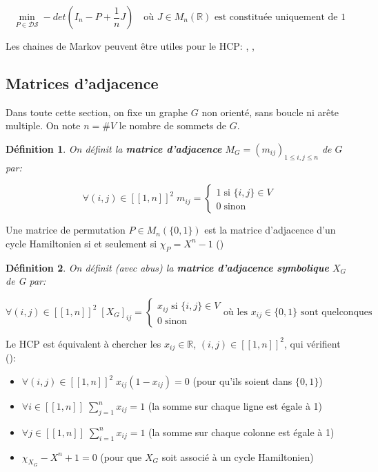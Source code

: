\documentclass{article}
\newtheorem{definition}{Définition}[section]
\begin{document}
\[
\min_{P \in \mathcal{D}\mathcal{S}} -det(I_{n}-P+\frac{1}{n}J) \quad \text{où $J \in M_{n}(\mathbb{R})$ est constituée uniquement de 1}
\]

Les chaines de Markov peuvent être utiles pour le HCP: \cite{Haythorpe2013MarkovCB}, \cite{Ejov2009ConsistentBO}, \cite{Filar2007ControlledMC}


\subsection{Matrices d'adjacence}
Dans toute cette section, on fixe un graphe $G$ non orienté, sans boucle ni arête multiple. On note $n=\# V$ le nombre de sommets de $G$.

\begin{definition}
On définit la \textbf{matrice d'adjacence} $M_G=(m_{ij})_{1 \le i,j \le n}$ de $G$ par:

\[
\forall (i,j) \in [\![1,n]\!]^2 \; m_{ij}=
	\begin{cases}
	1 \; \text{si $\{i,j\} \in V$}\\
	0 \; \text{sinon}
	\end{cases}
\]
\end{definition}

Une matrice de permutation $P \in M_{n}(\{0,1\})$ est la matrice d'adjacence d'un cycle Hamiltonien si et seulement si $\chi _{P} = X^{n}-1$ (\cite{Ejov2006SOLVINGTH})

\begin{definition}
On définit (avec abus) la \textbf{matrice d'adjacence symbolique} $X_{G}$ de G par:

\[
\forall (i,j) \in [\![1,n]\!]^2 \; [X_{G}]_{ij}=
	\begin{cases}
	x_{ij} \; \text{si $\{i,j\} \in V$}\\
	0 \; \text{sinon}
	\end{cases}
\text{où les $x_{ij} \in \{0,1\}$ sont quelconques}
\]
\end{definition}

Le HCP est équivalent à chercher les $x_{ij} \in \mathbb{R}$, $(i,j) \in [\![1,n]\!]^2$, qui vérifient (\cite{Ejov2006SOLVINGTH}):

\begin{itemize}
\item $\forall (i,j) \in [\![1,n]\!]^2 \; x_{ij}(1-x_{ij})=0$ \quad (pour qu'ils soient dans $\{0,1\}$)
\item $\forall i \in [\![1,n]\!] \; \sum\limits_{j=1}^{n}x_{ij}=1$ \quad (la somme sur chaque ligne est égale à 1)
\item $\forall j \in [\![1,n]\!] \; \sum\limits_{i=1}^{n}x_{ij}=1$ \quad (la somme sur chaque colonne est égale à 1)
\item $\chi_{X_{G}} - X^{n}+1=0$ \quad (pour que $X_{G}$ soit associé à un cycle Hamiltonien)
\end{itemize}
\end{document}
